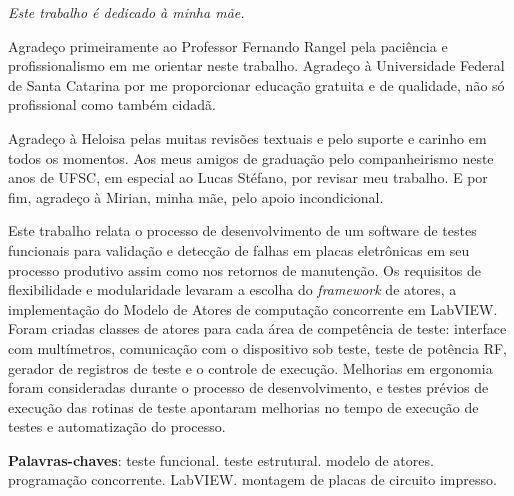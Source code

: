 \begin{dedicatoria}
   \vspace*{\fill}
   \centering
   \noindent
    \textit{Este trabalho é dedicado à minha mãe.} \vspace*{\fill}
\end{dedicatoria}

\begin{agradecimentos}



Agradeço primeiramente ao Professor Fernando Rangel pela paciência e profissionalismo em me orientar neste trabalho. Agradeço à Universidade Federal de Santa Catarina por me proporcionar educação gratuita e de qualidade, não só profissional como também cidadã.

Agradeço à Heloisa pelas muitas revisões textuais e pelo suporte e carinho em todos os momentos. 
Aos meus amigos de graduação pelo companheirismo neste anos de UFSC, em especial ao Lucas Stéfano, por revisar meu trabalho. E por fim, agradeço à Mirian, minha mãe, pelo apoio incondicional.

\end{agradecimentos}




\setlength{\absparsep}{18pt} %
\begin{resumo}
    Este trabalho relata o processo de desenvolvimento de um software de testes funcionais para validação e detecção de falhas em placas eletrônicas em seu processo produtivo assim como nos retornos de manutenção. Os requisitos de flexibilidade e modularidade levaram a escolha do \textit{framework} de atores, a implementação do Modelo de Atores de computação concorrente em LabVIEW. Foram criadas classes de atores para cada área de competência de teste: interface com multímetros, comunicação com o dispositivo sob teste, teste de potência RF, gerador de registros de teste e o controle de execução. Melhorias em ergonomia foram consideradas durante o processo de desenvolvimento, e testes prévios de execução das rotinas de teste apontaram melhorias no tempo de execução de testes e automatização do processo.
    
 
    \textbf{Palavras-chaves}: teste funcional. teste estrutural. modelo de atores. programação concorrente. LabVIEW. montagem de placas de circuito impresso. 
\end{resumo}

